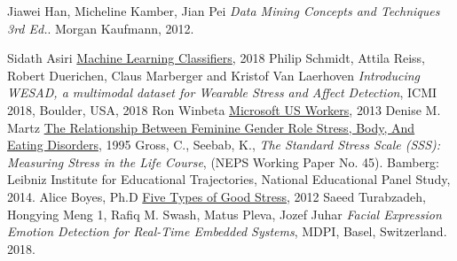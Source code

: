 \newpage

\begin{thebibliography}{9}
	Jiawei Han, Micheline Kamber, Jian Pei
	\textit{Data Mining Concepts and Techniques 3rd Ed.}. 
	Morgan Kaufmann, 2012.

	Sidath Asiri
	\href{https://towardsdatascience.com/machine-learning-classifiers-a5cc4e1b0623}{Machine Learning Classifiers},
	2018
	Philip Schmidt, Attila Reiss, Robert Duerichen, Claus Marberger and Kristof Van Laerhoven
	\textit{Introducing WESAD, a multimodal dataset for Wearable Stress and Affect Detection}, 
	ICMI 2018, Boulder, USA, 2018
	Ron Winbeta
	\href{https://www.onmsft.com/news/microsoft-us-workers-spend-7-hours-computer-day-average}{Microsoft US Workers},
	2013
	Denise M. Martz
	\href{https://onlinelibrary.wiley.com/doi/abs/10.1111/j.1471-6402.1995.tb00088.x}{The Relationship Between Feminine Gender Role Stress, Body, And Eating Disorders},
	1995
	Gross, C., Seebab, K.,
	\textit{The Standard Stress Scale (SSS): Measuring Stress in the Life Course},
	(NEPS Working Paper No. 45). Bamberg: Leibniz Institute for Educational Trajectories,
National Educational Panel Study, 2014.
	Alice Boyes, Ph.D 
	\href{https://www.psychologytoday.com/us/blog/in-practice/201206/five-types-good-stress}{Five Types of Good Stress}, 2012
	Saeed Turabzadeh, Hongying Meng 1, Rafiq M. Swash, Matus Pleva, Jozef Juhar
	\textit{Facial Expression Emotion Detection for Real-Time Embedded Systems}, 
	MDPI, Basel, Switzerland. 2018.
\end{thebibliography}
